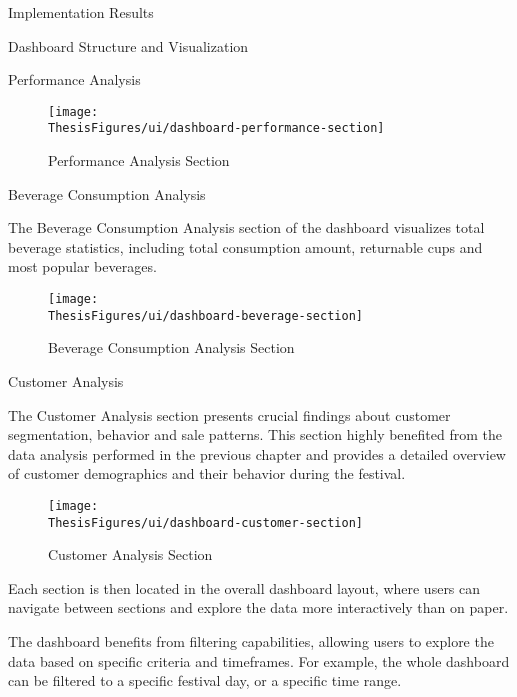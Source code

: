 \begin{section}{Implementation Results}
\begin{subsection}{Dashboard Structure and Visualization}
\begin{subsubsection}{Performance Analysis}
			\begin{figure}[H]
				\centering
				\texttt{[image: \\ThesisFigures/ui/dashboard-performance-section]}
				\caption{Performance Analysis Section}
				\label{fig:dashboard-performance-metrics}
			\end{figure}
		\end{subsubsection}

		\begin{subsubsection}{Beverage Consumption Analysis}
			\label{subsubsec:implementation-results-structure-beverage}

			The Beverage Consumption Analysis section of the dashboard visualizes total beverage statistics, including total consumption amount, returnable cups and most popular beverages.

			\begin{figure}[H]
				\centering
				\texttt{[image: \\ThesisFigures/ui/dashboard-beverage-section]}
				\caption{Beverage Consumption Analysis Section}
				\label{fig:dashboard-beverage-sales}
			\end{figure}
		\end{subsubsection}

		\begin{subsubsection}{Customer Analysis}
			\label{subsubsec:implementation-results-structure-customer}

			The Customer Analysis section presents crucial findings about customer segmentation, behavior and sale patterns.
			This section highly benefited from the data analysis performed in the previous chapter and provides a detailed overview of customer demographics and their behavior during the festival.

			\begin{figure}[H]
				\centering
				\texttt{[image: \\ThesisFigures/ui/dashboard-customer-section]}
				\caption{Customer Analysis Section}
				\label{fig:dashboard-customer-behavior}
			\end{figure}
		\end{subsubsection}

		Each section is then located in the overall dashboard layout, where users can navigate between sections and explore the data more interactively than on paper.

		The dashboard benefits from filtering capabilities, allowing users to explore the data based on specific criteria and timeframes.
		For example, the whole dashboard can be filtered to a specific festival day, or a specific time range.
	\end{subsection}


\end{section}
